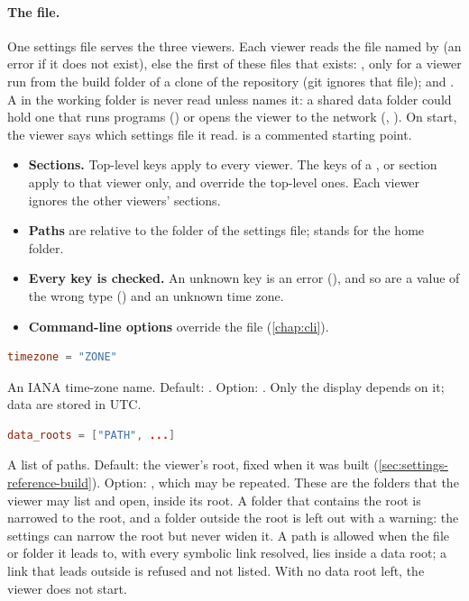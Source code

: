 \paragraph{The file.} One settings file serves the three viewers. Each viewer reads the file
named by  (an error if it does not exist), else the first of these files
that exists: , only for a viewer run from the build
folder of a clone of the repository (git ignores that file); and
. A  in the
working folder is never read unless  names it: a shared data folder could hold
one that runs programs () or opens the viewer to the network (,
). On start, the viewer says which settings file it read.
 is a commented starting point.
\begin{itemize}
\item \textbf{Sections.} Top-level keys apply to every viewer. The keys of a \code{[py]},
  \code{[rs]} or \code{[cpp]} section apply to that viewer only, and override the top-level ones.
  Each viewer ignores the other viewers' sections.
\item \textbf{Paths} are relative to the folder of the settings file; \code{\textasciitilde}
  stands for the home folder.
\item \textbf{Every key is checked.} An unknown key is an error (),
  and so are a value of the wrong type () and an unknown time zone.
\item \textbf{Command-line options} override the file (\cref{chap:cli}).
\end{itemize}

\begin{lstlisting}[style=signature,language=TOML]
timezone = "ZONE"
\end{lstlisting}
An IANA time-zone name. Default: . Option: . Only the
display depends on it; data are stored in UTC.

\begin{lstlisting}[style=signature,language=TOML]
data_roots = ["PATH", ...]
\end{lstlisting}
A list of paths. Default: the viewer's root, fixed when it was built
(\cref{sec:settings-reference-build}). Option: , which may be repeated. These
are the folders that the viewer may list and open, inside its root. A folder that contains the
root is narrowed to the root, and a folder outside the root is left out with a warning: the
settings can narrow the root but never widen it. A path is allowed when the file or folder it
leads to, with every symbolic link resolved, lies inside a data root; a link that leads outside is
refused and not listed. With no data root left, the viewer does not start.

